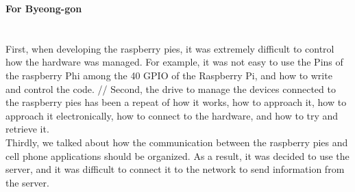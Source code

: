 \documentclass[10pt,a4paper,twocolumn]{report}
\begin{document}
    \textbf{For Byeong-gon} \\\\\\
   \indent First, when developing the raspberry pies, it was extremely difficult to control how the hardware was managed. For example, it was not easy to use the Pins of the raspberry Phi among the 40 GPIO of the Raspberry Pi, and how to write and control the code. //
   \indent Second, the drive to manage the devices connected to the raspberry pies has been a repeat of how it works, how to approach it, how to approach it electronically, how to connect to the hardware, and how to try and retrieve it.\\
   \indent Thirdly, we talked about how the communication between the raspberry pies and cell phone applications should be organized. As a result, it was decided to use the server, and it was difficult to connect it to the network to send information from the server. \\
 
      
 
 
		
		
		
\end{document}

